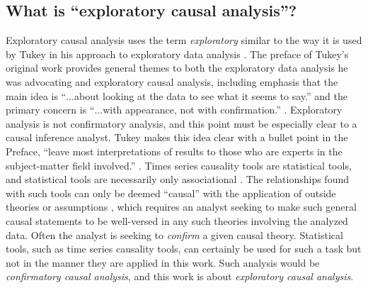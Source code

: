\documentclass{article}[10pt]
\begin{document}
\subsection{What is ``exploratory causal analysis''?}
\label{sec:whatisECA}
Exploratory causal analysis uses the term {\em exploratory} similar to the way it is used by Tukey in his approach to exploratory data analysis \cite{Tukey1977}.  The preface of Tukey's original work provides general themes to both the exploratory data analysis he was advocating and exploratory causal analysis, including emphasis that the main idea is ``$\ldots$about looking at the data to see what it seems to say.'' and the primary concern is ``$\ldots$with appearance, not with confirmation.'' \cite{Tukey1977}.  Exploratory analysis is not confirmatory analysis, and this point must be especially clear to a causal inference analyst.  Tukey makes this idea clear with a bullet point in the Preface, ``leave most interpretations of results to those who are experts in the subject-matter field involved.'' \cite{Tukey1977}.  Times series causality tools are statistical tools, and statistical tools are necessarily only associational \cite{Illari2014}.  The relationships found with such tools can only be deemed ``causal'' with the application of outside theories or assumptions \cite{Illari2014}, which requires an analyst seeking to make such general causal statements to be well-versed in any such theories involving the analyzed data.  Often the analyst is seeking to {\em confirm} a given causal theory.  Statistical tools, such as time series causality tools, can certainly be used for such a task but not in the manner they are applied in this work.  Such analysis would be {\em confirmatory causal analysis}, and this work is about {\em exploratory causal analysis}.  
\end{document}
